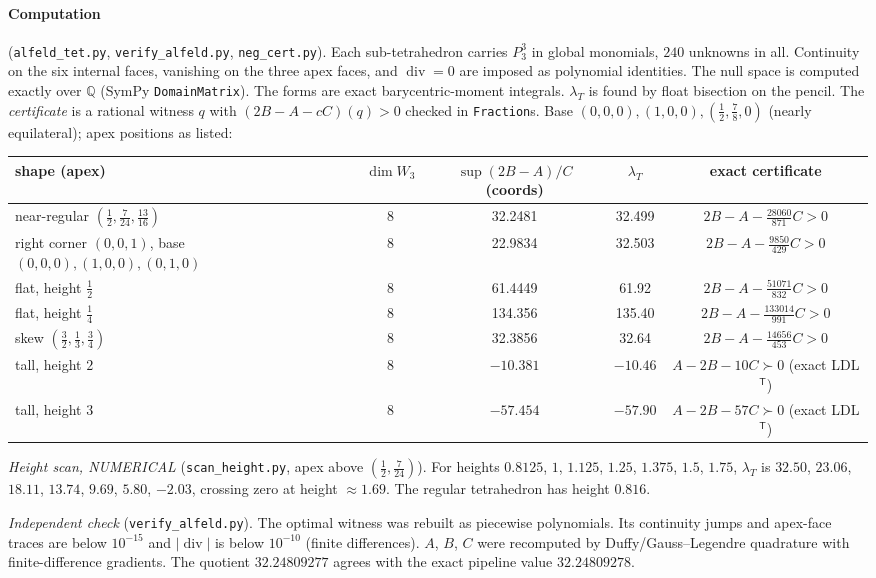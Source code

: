 \documentclass[11pt]{article}
\theoremstyle{remark}\newtheorem{remark}[theorem]{Remark}
\begin{document}
\paragraph{Computation} (\texttt{alfeld\_tet.py}, \texttt{verify\_alfeld.py}, \texttt{neg\_cert.py}). Each sub-tetrahedron carries $P_3^3$ in global monomials, $240$ unknowns in all. Continuity on the six internal faces, vanishing on the three apex faces, and $\operatorname{div}=0$ are imposed as polynomial identities. The null space is computed exactly over $\mathbb Q$ (SymPy \texttt{DomainMatrix}). The forms are exact barycentric-moment integrals. $\lambda_T$ is found by float bisection on the pencil. The \emph{certificate} is a rational witness $q$ with $(2B-A-cC)(q)>0$ checked in \texttt{Fraction}s. Base $(0,0,0),(1,0,0),(\tfrac12,\tfrac78,0)$ (nearly equilateral); apex positions as listed:
\begin{center}\small\begin{tabular}{lcccc}
shape (apex) & $\dim W_3$ & $\sup(2B-A)/C$ (coords) & $\lambda_T$ & exact certificate\\\hline
near-regular $(\tfrac12,\tfrac7{24},\tfrac{13}{16})$ & 8 & 32.2481 & 32.499 & $2B-A-\tfrac{28060}{871}C>0$\\
right corner $(0,0,1)$, base $(0,0,0),(1,0,0),(0,1,0)$ & 8 & 22.9834 & 32.503 & $2B-A-\tfrac{9850}{429}C>0$\\
flat, height $\tfrac12$ & 8 & 61.4449 & 61.92 & $2B-A-\tfrac{51071}{832}C>0$\\
flat, height $\tfrac14$ & 8 & 134.356 & 135.40 & $2B-A-\tfrac{133014}{991}C>0$\\
skew $(\tfrac32,\tfrac13,\tfrac34)$ & 8 & 32.3856 & 32.64 & $2B-A-\tfrac{14656}{453}C>0$\\
tall, height $2$ & 8 & $-10.381$ & $-10.46$ & $A-2B-10C\succ0$ (exact LDL$^{\mathsf T}$)\\
tall, height $3$ & 8 & $-57.454$ & $-57.90$ & $A-2B-57C\succ0$ (exact LDL$^{\mathsf T}$)
\end{tabular}\end{center}
\emph{Height scan, NUMERICAL} (\texttt{scan\_height.py}, apex above $(\tfrac12,\tfrac7{24})$). For heights $0.8125$, $1$, $1.125$, $1.25$, $1.375$, $1.5$, $1.75$, $\lambda_T$ is $32.50$, $23.06$, $18.11$, $13.74$, $9.69$, $5.80$, $-2.03$, crossing zero at height $\approx1.69$. The regular tetrahedron has height $0.816$.

\emph{Independent check} (\texttt{verify\_alfeld.py}). The optimal witness was rebuilt as piecewise polynomials. Its continuity jumps and apex-face traces are below $10^{-15}$ and $|\operatorname{div}|$ is below $10^{-10}$ (finite differences). $A$, $B$, $C$ were recomputed by Duffy/Gauss--Legendre quadrature with finite-difference gradients. The quotient $32.24809277$ agrees with the exact pipeline value $32.24809278$.
\end{document}

